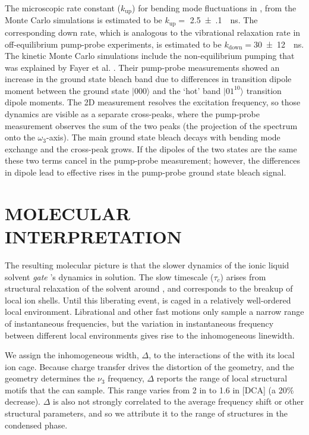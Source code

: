 \documentclass[%
  class = book,%
  crop = false,%
  float = true,%
  multi = true,%
  preview = false,%
]{standalone}
\let\cite\autocite
\newcommand{\caps}[1]{\uppercase{#1}}
\begin{document}
{The microscopic rate constant ($k_{\mathrm{up}}$) for  bending mode fluctuations in \ce{[Im_{4,1}][TfO]}, from the Monte Carlo simulations is estimated to be $k_{\mathrm{up}} =$ \SI{2.5(1)}{\per\ns}. The corresponding down rate, which is analogous to the vibrational relaxation rate in off-equilibrium pump-probe experiments, is estimated to be $k_{\mathrm{down}} =$\SI{30(12)}{\per\ns}. The kinetic Monte Carlo simulations include the non-equilibrium pumping that was explained by Fayer et al. \cite{Giammanco2016}. Their pump-probe measurements showed an increase in the ground state bleach band due to differences in transition dipole moment between the ground state $|000\rangle$ and the `hot' band $|01^10\rangle$ transition dipole moments. The 2D measurement resolves the excitation frequency, so those dynamics are visible as a separate cross-peaks, where the pump-probe measurement observes the sum of the two peaks (the projection of the spectrum onto the \(\omega_3\)-axis). The main ground state bleach decays with bending mode exchange and the cross-peak grows. If the dipoles of the two states are the same these two terms cancel in the pump-probe measurement; however, the differences in dipole lead to effective rises in the pump-probe ground state bleach signal.

\section{\texorpdfstring{\caps{Molecular Interpretation}}{Molecular Interpretation}}
\label{sec:anions_interpretation}

The resulting molecular picture is that the slower dynamics of the ionic liquid solvent \textit{gate} 's dynamics in solution. The slow timescale (\(\tau_c\)) arises from structural relaxation of the solvent around , and corresponds to the breakup of local ion shells. Until this liberating event,  is caged in a relatively well-ordered local environment. Librational and other fast motions only sample a narrow range of instantaneous frequencies, but the variation in instantaneous frequency between different local environments gives rise to the inhomogeneous linewidth.

We assign the inhomogeneous width, \(\Delta\), to the interactions of the  with its local ion cage. Because charge transfer drives the distortion of the  geometry, and the geometry determines the \(\nu_3\) frequency, \(\Delta\) reports the range of local structural motifs that the  can sample.
This range varies from \SI{2}{\wavenumber} in \ce{[PF6]} to \SI{1.6}{\wavenumber} in [DCA]  (a 20\% decrease). \(\Delta\) is also not strongly correlated to the average frequency shift or other structural parameters, and so we attribute it to the range of structures in the condensed phase.

}
\end{document}
